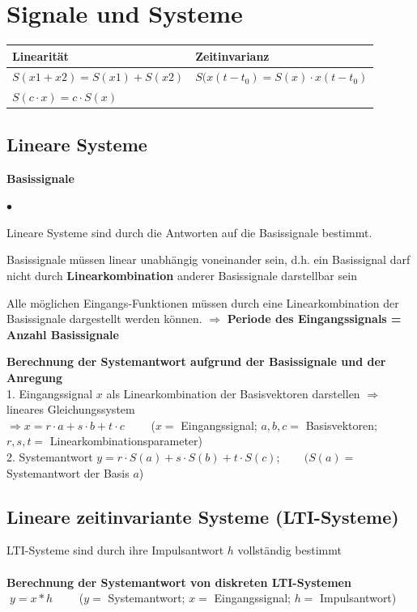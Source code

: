 \section{Signale und Systeme}
  	\renewcommand{\arraystretch}{1.5}
	\begin{tabular}{|l|l|}
    	\hline
    	\textbf{Linearität} & \textbf{Zeitinvarianz}\\
    	\hline
    	$S(x1+x2)=S(x1)+S(x2)$ & $S(x(t-t_0)=S(x)\cdot x(t-t_0)$ \\
    	$S(c\cdot x)=c\cdot S(x)$ & \\
		\hline    
    \end{tabular}
  	\renewcommand{\arraystretch}{1}
  	
	\subsection{Lineare Systeme}
		\textbf{Basissignale}
		\begin{list}{$\bullet$}{\setlength{\itemsep}{0cm} \setlength{\parsep}{0cm} \setlength{\topsep}{0cm}} 
          \item Lineare Systeme sind durch die Antworten auf die
          Basissignale bestimmt.
          \item Basissignale müssen linear unabhängig voneinander sein, d.h. ein
		Basissignal darf nicht durch \textbf{Linearkombination} anderer Basissignale
		darstellbar sein          
		  \item Alle möglichen Eingangs-Funktionen müssen durch eine Linearkombination der
		Basissignale dargestellt werden können. $\Rightarrow$ \textbf{Periode des Eingangssignals =	Anzahl Basissignale}
        \end{list}
        \vspace{.2cm}
		\textbf{Berechnung der Systemantwort aufgrund der Basissignale und der
		Anregung}\\
		1. Eingangssignal $x$ als Linearkombination der Basisvektoren darstellen
		$\Rightarrow$ lineares Gleichungssystem\\
		$\Rightarrow x=r\cdot a + s\cdot b + t\cdot c\qquad$ ($x=$
		Eingangssignal; $a,b,c=$ Basisvektoren; $r,s,t=$
		Linearkombinationsparameter)\\ 
		2. Systemantwort $y=r\cdot S(a) + s\cdot S(b) + t\cdot S(c); \qquad (S(a)=$
		Systemantwort der Basis $a$)
	
	\subsection{Lineare zeitinvariante Systeme (LTI-Systeme)}
		LTI-Systeme sind durch ihre Impulsantwort $h$ vollständig bestimmt\\ \\
		\textbf{Berechnung der Systemantwort von diskreten LTI-Systemen}\\
		$\; y=x*h \qquad$ ($y=$ Systemantwort; $x=$ Eingangssignal; $h=$
		Impulsantwort)\\
		
